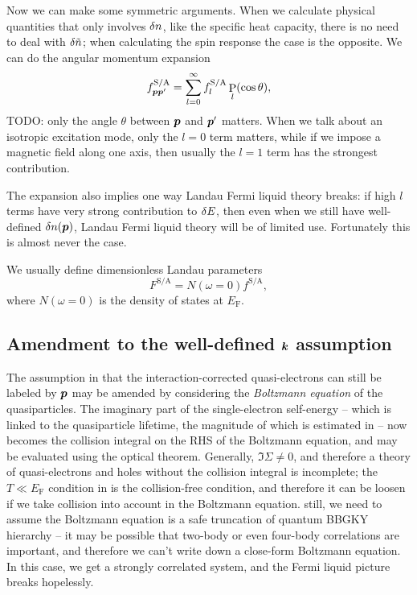 \documentclass[hyperref, a4paper]{article}
\DeclareMathOperator{\legpoly}{P}
\newcommand*{\efermi}{E_{\text{F}}}
\begin{document}
Now we can make some symmetric arguments.
When we calculate physical quantities that only involves $\var{n}$, 
like the specific heat capacity, 
there is no need to deal with $\var{\tilde{n}}$;
when calculating the spin response the case is the opposite. 
We can do the angular momentum expansion 
\begin{equation}
    f^{\text{S/A}}_{\vb*{p} \vb*{p}'} = \sum_{l=0}^{\infty} f^{\text{S/A}}_l \legpoly_l(\cos \theta), 
    \label{eq:landau-liquid.angular-expansion}
\end{equation}
TODO: only the angle $\theta$ between $\vb*{p}$ and $\vb*{p}'$ matters. 
When we talk about an isotropic excitation mode, 
only the $l = 0$ term matters, 
while if we impose a magnetic field along one axis, 
then usually the $l = 1$ term has the strongest contribution. 

The expansion  
also implies one way Landau Fermi liquid theory breaks: 
if high $l$ terms have very strong contribution to $\var{E}$, 
then even when we still have well-defined $\var{n(\vb*{p})}$, 
Landau Fermi liquid theory will be of limited use. 
Fortunately this is almost never the case. 

We usually define dimensionless Landau parameters 
\begin{equation}
    F^{\text{S/A}} = N(\omega = 0) f^{\text{S/A}},
\end{equation}
where $N(\omega = 0)$ is the density of states at $\efermi$.

\subsection{Amendment to the well-defined $\vb*{k}$ assumption}

The assumption in  
that the interaction-corrected quasi-electrons 
can still be labeled by $\vb*{p}$
may be amended by considering 
the \emph{Boltzmann equation} of the quasiparticles.
The imaginary part of the single-electron self-energy -- 
which is linked to the quasiparticle lifetime, 
the magnitude of which is estimated in  -- 
now becomes the collision integral 
on the RHS of the Boltzmann equation, 
and may be evaluated using the optical theorem.
Generally, $\Im \Sigma \neq 0$, 
and therefore a theory of quasi-electrons and holes 
without the collision integral is incomplete; 
the $T \ll \efermi$ condition in  
is the collision-free condition,
and therefore it can be loosen if we take collision into account 
in the Boltzmann equation.
still, we need to assume the Boltzmann equation 
is a safe truncation of quantum BBGKY hierarchy -- 
it may be possible that two-body or even four-body correlations are important, 
and therefore we can't write down a close-form Boltzmann equation.
In this case, we get a strongly correlated system, 
and the Fermi liquid picture breaks hopelessly.
\end{document}
